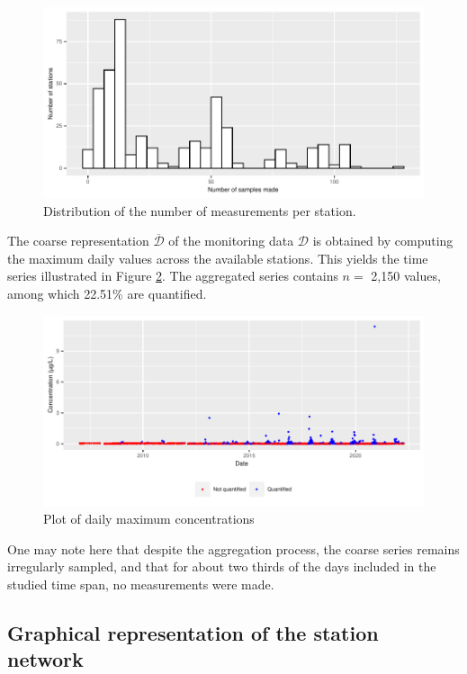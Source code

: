 \begin{figure}[htbp]
  \centering
  \includegraphics[]{figs/Chap5/hist_samp_sta.pdf}
  \caption{Distribution of the number of measurements per station.}
  \label{fig:histogram}
\end{figure}

The coarse representation $\overline{\mathcal{D}}$ of the monitoring data $\mathcal{D}$ is obtained by computing the maximum daily values across the available stations. This yields the time series illustrated in Figure \ref{time:serie}. The aggregated series contains $n =$ 2,150 values, among which 22.51\% are quantified. 

\begin{figure}[htbp]
  \centering
  \includegraphics[]{figs/Chap5/Max_temp-1.pdf}
  \caption{Plot of daily maximum concentrations}
  \label{time:serie}
\end{figure}

One may note here that despite the aggregation process, the coarse series remains irregularly sampled, and that for about two thirds of the days included in the studied time span, no measurements were made. 

\subsection{Graphical representation of the station network}\label{subsection:graph:construct}

